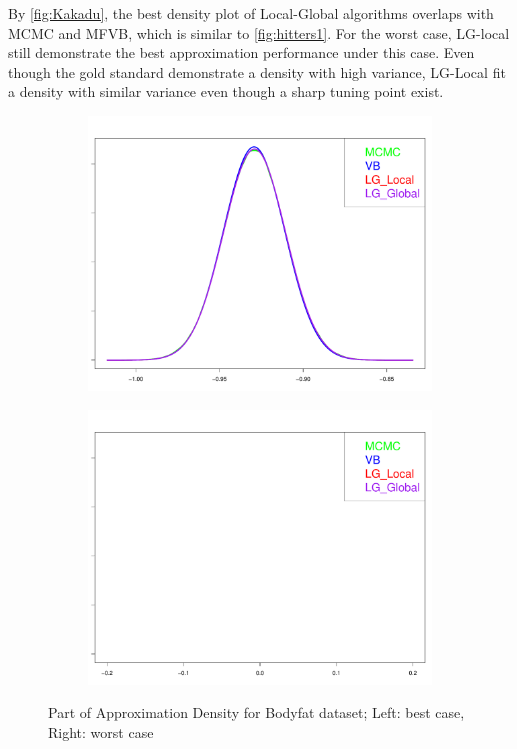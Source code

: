 By \autoref{fig:Kakadu}, the best density plot of Local-Global algorithms overlaps with MCMC and MFVB, which is similar to \autoref{fig:hitters1}. For the worst case, LG-local still demonstrate the best approximation performance under this case. Even though the gold standard demonstrate a density with high variance, LG-Local fit a density with similar variance even though a sharp tuning point exist.\\
\begin{figure}[h]
	\begin{subfigure}{0.5\textwidth}
		\centering
		\includegraphics[page = 1, width=\linewidth,keepaspectratio]{lasso_densities_Bodyfat.pdf}
	\end{subfigure}
	\begin{subfigure}{0.5\textwidth}
		\includegraphics[page = 8, width=\linewidth,keepaspectratio]{lasso_densities_Bodyfat-1.pdf}
	\end{subfigure}
	\caption{Part of Approximation Density for Bodyfat dataset; Left: best case, Right: worst case}
	\label{fig:Bodyfat}
\end{figure}
